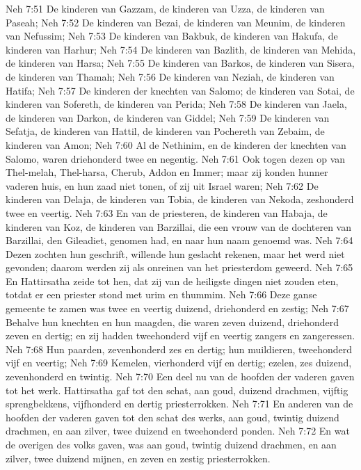 Neh 7:51  De kinderen van Gazzam, de kinderen van Uzza, de kinderen van Paseah;
Neh 7:52  De kinderen van Bezai, de kinderen van Meunim, de kinderen van Nefussim;
Neh 7:53  De kinderen van Bakbuk, de kinderen van Hakufa, de kinderen van Harhur;
Neh 7:54  De kinderen van Bazlith, de kinderen van Mehida, de kinderen van Harsa;
Neh 7:55  De kinderen van Barkos, de kinderen van Sisera, de kinderen van Thamah;
Neh 7:56  De kinderen van Neziah, de kinderen van Hatifa;
Neh 7:57  De kinderen der knechten van Salomo; de kinderen van Sotai, de kinderen van Sofereth, de kinderen van Perida;
Neh 7:58  De kinderen van Jaela, de kinderen van Darkon, de kinderen van Giddel;
Neh 7:59  De kinderen van Sefatja, de kinderen van Hattil, de kinderen van Pochereth van Zebaim, de kinderen van Amon;
Neh 7:60  Al de Nethinim, en de kinderen der knechten van Salomo, waren driehonderd twee en negentig.
Neh 7:61  Ook togen dezen op van Thel-melah, Thel-harsa, Cherub, Addon en Immer; maar zij konden hunner vaderen huis, en hun zaad niet tonen, of zij uit Israel waren;
Neh 7:62  De kinderen van Delaja, de kinderen van Tobia, de kinderen van Nekoda, zeshonderd twee en veertig.
Neh 7:63  En van de priesteren, de kinderen van Habaja, de kinderen van Koz, de kinderen van Barzillai, die een vrouw van de dochteren van Barzillai, den Gileadiet, genomen had, en naar hun naam genoemd was.
Neh 7:64  Dezen zochten hun geschrift, willende hun geslacht rekenen, maar het werd niet gevonden; daarom werden zij als onreinen van het priesterdom geweerd.
Neh 7:65  En Hattirsatha zeide tot hen, dat zij van de heiligste dingen niet zouden eten, totdat er een priester stond met urim en thummim.
Neh 7:66  Deze ganse gemeente te zamen was twee en veertig duizend, driehonderd en zestig;
Neh 7:67  Behalve hun knechten en hun maagden, die waren zeven duizend, driehonderd zeven en dertig; en zij hadden tweehonderd vijf en veertig zangers en zangeressen.
Neh 7:68  Hun paarden, zevenhonderd zes en dertig; hun muildieren, tweehonderd vijf en veertig;
Neh 7:69  Kemelen, vierhonderd vijf en dertig; ezelen, zes duizend, zevenhonderd en twintig.
Neh 7:70  Een deel nu van de hoofden der vaderen gaven tot het werk. Hattirsatha gaf tot den schat, aan goud, duizend drachmen, vijftig sprengbekkens, vijfhonderd en dertig priesterrokken.
Neh 7:71  En anderen van de hoofden der vaderen gaven tot den schat des werks, aan goud, twintig duizend drachmen, en aan zilver, twee duizend en tweehonderd ponden.
Neh 7:72  En wat de overigen des volks gaven, was aan goud, twintig duizend drachmen, en aan zilver, twee duizend mijnen, en zeven en zestig priesterrokken.
